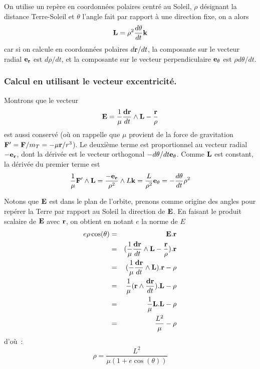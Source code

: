 \documentclass[a4paper,11pt]{article}
\begin{document}
\begin{giacjshere}
On utilise un repère en coordonnées polaires centré au Soleil,
$\rho$ désignant la distance Terre-Soleil et $\theta$ l'angle
fait par rapport à une direction fixe, on a alors
\[ {\bf L} = \rho^2 \frac{d\theta}{dt} {\bf k}\]
car si on calcule en coordonn\'ees polaires $d {\bf r}/dt$,
la composante sur le vecteur radial ${\bf e_r}$ est $d\rho/dt$, et
la composante sur le vecteur perpendiculaire ${\bf e_\theta}$
est $\rho d\theta/dt$.

\subsubsection{Calcul en utilisant le vecteur excentricit\'e.}
Montrons que le vecteur
\[ {\bf E}= \frac{1}{\mu} \frac{\bf dr}{dt} \wedge {\bf L} - 
\frac{\bf r}{\rho}\]
est aussi conserv\'e (o\`u on rappelle que $\mu$ provient
de la force de gravitation ${\bf F'}={\bf F}/m_T=-\mu {\bf r}/r^3$).
Le deuxi\`eme terme est proportionnel au vecteur
radial $-{\bf e_r}$, dont la d\'eriv\'ee est le vecteur orthogonal
$-d\theta/dt {\bf e_\theta}$.
Comme ${\bf L}$ est constant, la d\'eriv\'ee du premier terme est
\[ \frac{1}{\mu} {\bf F'} \wedge {\bf L} = \frac{\bf -e_r}{\rho^2} \wedge L {\bf k}
= \frac{L}{\rho^2} {\bf e_\theta} = - \frac{d\theta}{dt} \rho^2\]

Notons que ${\bf E}$ est dans le plan de l'orbite, prenons comme origine
des angles pour rep\'erer la Terre par rapport au Soleil la direction
de ${\bf E}$. En faisant le produit scalaire de ${\bf E}$ avec ${\bf r}$, 
on obtient en notant $e$ la norme de $E$
\begin{eqnarray*} e \rho \cos(\theta) &=&  {\bf E}.{\bf r} \\
& = &  (\frac{1}{\mu} \frac{\bf dr}{dt} \wedge {\bf L}- 
\frac{\bf r}{\rho}) .{\bf r} 
\\
& = & (\frac{1}{\mu} \frac{\bf dr}{dt} \wedge {\bf L}).{\bf r}
- \rho \\
& = & \frac{1}{\mu} ({\bf r} \wedge  \frac{\bf dr}{dt} ).{\bf L} - \rho \\
&= & \frac{1}{\mu} {\bf L}.{\bf L}- \rho \\
&= &\frac{L^2}{\mu} - \rho
\end{eqnarray*}
d'o\`u~:
\[ \rho = \frac{L^2}{\mu(1+e \cos(\theta))}\]


\end{giacjshere}
\end{document}
